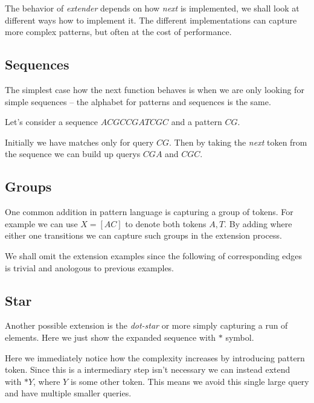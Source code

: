 The behavior of \emph{extender} depends on how \emph{next} is 
implemented, we shall look at different ways how to implement it.
The different implementations can capture more complex patterns,
but often at the cost of performance.

\subsection{Sequences}

The simplest case how the next function behaves is when we are 
only looking for simple sequences -- the alphabet for patterns
and sequences is the same.

Let's consider a sequence $ACGCCGATCGC$ and a pattern $CG$.

\begin{figure}[H]
	
\end{figure}

Initially we have matches only for query $CG$. Then by taking
the \emph{next} token from the sequence we can build up
querys $CGA$ and $CGC$.

\subsection{Groups}

One common addition in pattern language is capturing a group
of tokens. For example we can use $X = [AC]$ to denote both tokens $A, T$. 
By adding where either one transitions we can capture such groups in 
the extension process.

\begin{figure}[H]
	
\end{figure}

We shall omit the extension examples since the following of corresponding edges is trivial and anologous to previous examples.

\subsection{Star}

Another possible extension is the \emph{dot-star} or more simply capturing
a run of elements. Here we just show the expanded sequence with $*$ symbol.

\begin{figure}[H]
	
\end{figure}

Here we immediately notice how the complexity increases by introducing pattern token. Since this is a intermediary step isn't necessary we can instead extend with $*Y$, where $Y$ is some other token. This means we avoid this single large query and have multiple smaller queries.

